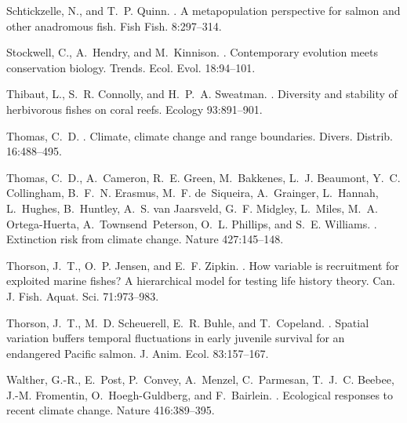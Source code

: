 \documentclass[12pt,english]{article}
\begin{document}
\begin{spacing}{1.3}
\begin{thebibliography}{64}
Schtickzelle, N., and T.~P. Quinn.
.
\newblock A metapopulation perspective for salmon and other anadromous fish.
\newblock Fish Fish. 8:297--314.

Stockwell, C., A.~Hendry, and M.~Kinnison.
.
\newblock Contemporary evolution meets conservation biology.
\newblock Trends. Ecol. Evol. 18:94--101.

Thibaut, L., S.~R. Connolly, and H.~P.~A. Sweatman.
.
\newblock Diversity and stability of herbivorous fishes on coral reefs.
\newblock Ecology 93:891--901.

Thomas, C.~D.
.
\newblock Climate, climate change and range boundaries.
\newblock Divers. Distrib. 16:488--495.

Thomas, C.~D., A.~Cameron, R.~E. Green, M.~Bakkenes, L.~J. Beaumont, Y.~C.
  Collingham, B.~F.~N. Erasmus, M.~F. de~Siqueira, A.~Grainger, L.~Hannah,
  L.~Hughes, B.~Huntley, A.~S. van Jaarsveld, G.~F. Midgley, L.~Miles, M.~A.
  Ortega-Huerta, A.~Townsend~Peterson, O.~L. Phillips, and S.~E. Williams.
.
\newblock Extinction risk from climate change.
\newblock Nature 427:145--148.

Thorson, J.~T., O.~P. Jensen, and E.~F. Zipkin.
.
\newblock How variable is recruitment for exploited marine fishes? A
  hierarchical model for testing life history theory.
\newblock Can. J. Fish. Aquat. Sci. 71:973--983.

Thorson, J.~T., M.~D. Scheuerell, E.~R. Buhle, and T.~Copeland.
.
\newblock Spatial variation buffers temporal fluctuations in early juvenile
  survival for an endangered {Pacific} salmon.
\newblock J. Anim. Ecol. 83:157--167.

Walther, G.-R., E.~Post, P.~Convey, A.~Menzel, C.~Parmesan, T.~J.~C. Beebee,
  J.-M. Fromentin, O.~Hoegh-Guldberg, and F.~Bairlein.
.
\newblock Ecological responses to recent climate change.
\newblock Nature 416:389--395.


\end{thebibliography}
\end{spacing}
\end{document}

